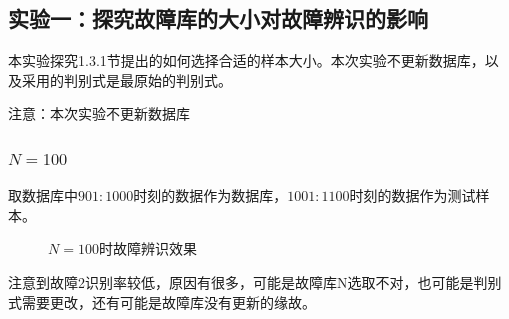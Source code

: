 \documentclass[lang=cn,11pt,a4paper]{elegantpaper}
\begin{document}
\subsection{实验一：探究故障库的大小对故障辨识的影响}
本实验探究1.3.1节提出的如何选择合适的样本大小。本次实验不更新数据库，以及采用的判别式是最原始的判别式。
\begin{shaded}
	注意：本次实验不更新数据库
\end{shaded}
\subsubsection{$N=100$}
取数据库中$901:1000$时刻的数据作为数据库，$1001:1100$时刻的数据作为测试样本。
\begin{figure}[H]
	\centering  %
	\caption{$N=100$时故障辨识效果}
	\label{Fig.main}
\end{figure}
注意到故障2识别率较低，原因有很多，可能是故障库N选取不对，也可能是判别式需要更改，还有可能是故障库没有更新的缘故。
\end{document}
